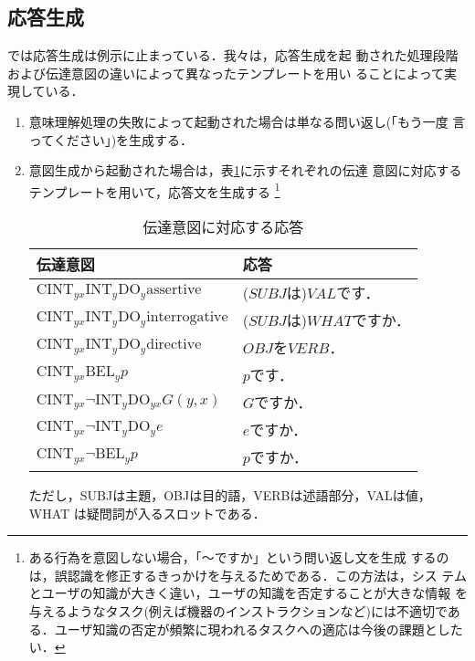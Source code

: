 \vspace{4mm}
\subsection{応答生成}

\cite{airenti93}では応答生成は例示に止まっている．我々は，応答生成を起
動された処理段階および伝達意図の違いによって異なったテンプレートを用い
ることによって実現している．

\begin{enumerate}
\item 意味理解処理の失敗によって起動された場合は単なる問い返し(「もう一度
言ってください」)を生成する．

\item  意図生成から起動された場合は，表\ref{step5}に示すそれぞれの伝達
意図に対応するテンプレートを用いて，応答文を生成する
\footnote{ある行為を意図しない場合，「〜ですか」という問い返し文を生成
するのは，誤認識を修正するきっかけを与えるためである．この方法は，シス
テムとユーザの知識が大きく違い，ユーザの知識を否定することが大きな情報
を与えるようなタスク(例えば機器のインストラクションなど)には不適切であ
る．\mbox{ユーザ知識の否定が頻繁に現われるタスクへの適応}は今後の課題としたい．}

\begin{table}[htbp]
\centering
\caption{伝達意図に対応する応答}
\label{step5}
\begin{tabular}{|l|l|}
\hline
伝達意図 & 応答 \\
\hline
\hline
$\mbox{CINT}_{yx} \mbox{INT}_y \mbox{DO}_y \mbox{assertive}$ &
 ($SUBJ$は)$VAL$です．\\
\hline
$\mbox{CINT}_{yx} \mbox{INT}_y \mbox{DO}_y \mbox{interrogative}$ &
 ($SUBJ$は)$WHAT$ですか．\\
\hline
$\mbox{CINT}_{yx} \mbox{INT}_y \mbox{DO}_y \mbox{directive}$ &
 $OBJ$を$VERB$．\\
\hline
$\mbox{CINT}_{yx} \mbox{BEL}_y p$&
 $p$です．\\
\hline
$\mbox{CINT}_{yx} \lnot \mbox{INT}_y \mbox{DO}_{yx} G(y,x)$ &
 $G$ですか．\\
\hline
$\mbox{CINT}_{yx} \lnot \mbox{INT}_y \mbox{DO}_y e$ &
 $e$ですか．\\
\hline
$\mbox{CINT}_{yx} \lnot \mbox{BEL}_y p$&
 $p$ですか．\\
\hline
\end{tabular}

\medskip

\begin{center}
\begin{minipage}{10cm}
\small
ただし，SUBJは主題，OBJは目的語，VERBは述語部分，VALは値，WHAT
は疑問詞が入るスロットである．
\end{minipage}
\end{center}
\end{table}

\end{enumerate}

